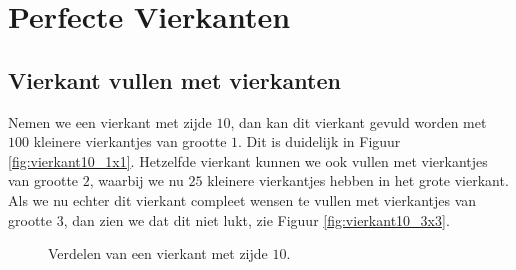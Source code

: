 
\section{Perfecte Vierkanten}

\subsection{Vierkant vullen met vierkanten}

Nemen we een vierkant met zijde $10$, dan kan dit vierkant gevuld worden met $100$ kleinere vierkantjes van grootte $1$. Dit is duidelijk in Figuur \ref{fig:vierkant10_1x1}. Hetzelfde vierkant kunnen we ook vullen met vierkantjes van grootte $2$, waarbij we nu $25$ kleinere vierkantjes hebben in het grote vierkant. Als we nu echter dit vierkant compleet wensen te vullen met vierkantjes van grootte $3$, dan zien we dat dit niet lukt, zie Figuur \ref{fig:vierkant10_3x3}.

\begin{figure}[ht]
  \centering
  \caption{Verdelen van een vierkant met zijde $10$.}
\end{figure}

